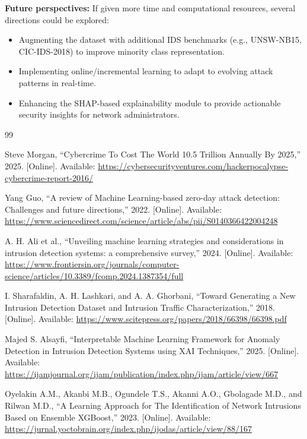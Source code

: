 \documentclass[12pt, a4paper]{article}
\begin{document}
\noindent
\textbf{Future perspectives:} If given more time and computational resources, several directions could be explored:
\begin{itemize}[nosep]
    \item Augmenting the dataset with additional IDS benchmarks (e.g., UNSW-NB15, CIC-IDS-2018) to improve minority class representation.
    \item Implementing online/incremental learning to adapt to evolving attack patterns in real-time.
    \item Enhancing the SHAP-based explainability module to provide actionable security insights for network administrators.
\end{itemize}

\newpage
\begin{thebibliography}{99}

Steve Morgan, ``Cybercrime To Cost The World 10.5 Trillion Annually By 2025,'' 2025. [Online]. Available: \url{https://cybersecurityventures.com/hackerpocalypse-cybercrime-report-2016/}

Yang Guo, ``A review of Machine Learning-based zero-day attack detection: Challenges and future directions,'' 2022. [Online]. Available: \url{https://www.sciencedirect.com/science/article/abs/pii/S0140366422004248}

A. H. Ali et al., ``Unveiling machine learning strategies and considerations in intrusion detection systems: a comprehensive survey,'' 2024. [Online]. Available: \url{https://www.frontiersin.org/journals/computer-science/articles/10.3389/fcomp.2024.1387354/full}

I. Sharafaldin, A. H. Lashkari, and A. A. Ghorbani, ``Toward Generating a New Intrusion Detection Dataset and Intrusion Traffic Characterization,'' 2018. [Online]. Available: \url{https://www.scitepress.org/papers/2018/66398/66398.pdf}

Majed S. Alsayfi, ``Interpretable Machine Learning Framework for Anomaly Detection in Intrusion Detection Systems using XAI Techniques,'' 2025. [Online]. Available: \url{https://ijamjournal.org/ijam/publication/index.php/ijam/article/view/667}

Oyelakin A.M., Akanbi M.B., Ogundele T.S., Akanni A.O., Gbolagade M.D., and Rilwan M.D., ``A Learning Approach for The Identification of Network Intrusions Based on Ensemble XGBoost,'' 2023. [Online]. Available: \url{https://jurnal.yoctobrain.org/index.php/ijodas/article/view/88/167}


\end{thebibliography}
\end{document}
